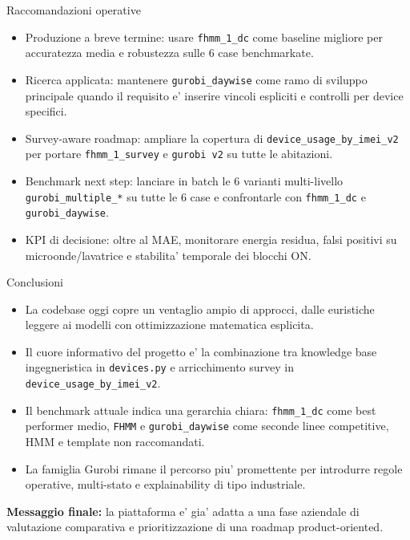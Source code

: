 \documentclass[aspectratio=169]{beamer}
\newcommand{\code}[1]{\texttt{#1}}
\begin{document}
\begin{frame}{Raccomandazioni operative}
\small
\begin{itemize}
  \item Produzione a breve termine: usare \code{fhmm\_1\_dc} come baseline migliore per accuratezza media e robustezza sulle 6 case benchmarkate.
  \item Ricerca applicata: mantenere \code{gurobi\_daywise} come ramo di sviluppo principale quando il requisito e' inserire vincoli espliciti e controlli per device specifici.
  \item Survey-aware roadmap: ampliare la copertura di \code{device\_usage\_by\_imei\_v2} per portare \code{fhmm\_1\_survey} e \code{gurobi v2} su tutte le abitazioni.
  \item Benchmark next step: lanciare in batch le 6 varianti multi-livello \code{gurobi\_multiple\_*} su tutte le 6 case e confrontarle con \code{fhmm\_1\_dc} e \code{gurobi\_daywise}.
  \item KPI di decisione: oltre al MAE, monitorare energia residua, falsi positivi su microonde/lavatrice e stabilita' temporale dei blocchi ON.
\end{itemize}
\end{frame}

\begin{frame}{Conclusioni}
\small
\begin{itemize}
  \item La codebase oggi copre un ventaglio ampio di approcci, dalle euristiche leggere ai modelli con ottimizzazione matematica esplicita.
  \item Il cuore informativo del progetto e' la combinazione tra knowledge base ingegneristica in \code{devices.py} e arricchimento survey in \code{device\_usage\_by\_imei\_v2}.
  \item Il benchmark attuale indica una gerarchia chiara: \code{fhmm\_1\_dc} come best performer medio, \code{FHMM} e \code{gurobi\_daywise} come seconde linee competitive, HMM e template non raccomandati.
  \item La famiglia Gurobi rimane il percorso piu' promettente per introdurre regole operative, multi-stato e explainability di tipo industriale.
\end{itemize}

\vfill
\centering
\textbf{Messaggio finale:} la piattaforma e' gia' adatta a una fase aziendale di valutazione comparativa e prioritizzazione di una roadmap product-oriented.
\end{frame}
\end{document}
